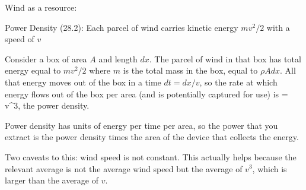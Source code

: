 \documentclass[11pt]{book}
\begin{document}


Wind as a resource:
\bee
\item Power Density (28.2): Each parcel of wind carries kinetic energy $mv^2/2$ with a speed of $v$
\item Consider a box of area $A$ and length $dx$. The parcel of wind in that box has total energy equal to $mv^2/2$ where $m$ is the total mass in the box, equal to $\rho Adx$. All that energy moves out of the box in a time $dt=dx/v$, so the rate at which energy flows out of the box per area (and is potentially captured for use) is 
\be
{}= \,\rho v^3\equiv {},
\ee
the power density.
\item Power density has units of energy per time per area, so the power that you extract is the power density times the area of the device that collects the energy.
\eee
{}

Two caveats to this: wind speed is not constant. This actually helps because the relevant average is not the average wind speed but the average of $v^3$, which is larger than the average of $v$. 
\end{document}
